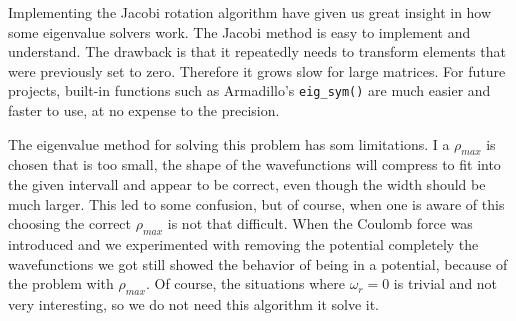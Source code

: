 Implementing the Jacobi rotation algorithm have given us great insight in how some
eigenvalue solvers work. The Jacobi method is easy to implement and understand. The
drawback is that it repeatedly needs to transform elements that were previously set to
zero. Therefore it grows slow for large matrices. For future projects, built-in functions
such as Armadillo's \texttt{eig\_sym()} are much easier and faster to use, at no expense to
the precision.

The eigenvalue method for solving this problem has som limitations. I a $\rho_{max}$ is chosen that is too small, the shape of the wavefunctions will compress to fit into the given intervall and appear to be correct, even though the width should be much larger. This led to some confusion, but of course, when one is aware of this choosing the correct $\rho_{max}$ is not that difficult. When the Coulomb force was introduced and we experimented with removing the potential completely the wavefunctions we got still showed the behavior of being in a potential, because of the problem with $\rho_{max}$. Of course, the situations where $\omega_r = 0$ is trivial and not very interesting, so we do not need this algorithm it solve it.
